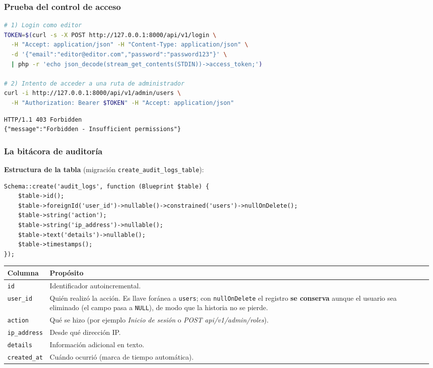 \subsubsection{Prueba del control de acceso}
\begin{lstlisting}[language=bash, caption={Un Editor intenta listar usuarios}]
# 1) Login como editor
TOKEN=$(curl -s -X POST http://127.0.0.1:8000/api/v1/login \
  -H "Accept: application/json" -H "Content-Type: application/json" \
  -d '{"email":"editor@editor.com","password":"password123"}' \
  | php -r 'echo json_decode(stream_get_contents(STDIN))->access_token;')

# 2) Intento de acceder a una ruta de administrador
curl -i http://127.0.0.1:8000/api/v1/admin/users \
  -H "Authorization: Bearer $TOKEN" -H "Accept: application/json"
\end{lstlisting}
\begin{lstlisting}[language={}, caption={Respuesta}]
HTTP/1.1 403 Forbidden
{"message":"Forbidden - Insufficient permissions"}
\end{lstlisting}

\subsubsection{La bitácora de auditoría}
\textbf{Estructura de la tabla} (migración \texttt{create\_audit\_logs\_table}):
\begin{lstlisting}[caption={Migración de audit\_logs}]
Schema::create('audit_logs', function (Blueprint $table) {
    $table->id();
    $table->foreignId('user_id')->nullable()->constrained('users')->nullOnDelete();
    $table->string('action');
    $table->string('ip_address')->nullable();
    $table->text('details')->nullable();
    $table->timestamps();
});
\end{lstlisting}
\begin{longtable}{p{3.2cm}p{11.8cm}}
\toprule
\textbf{Columna} & \textbf{Propósito} \\
\midrule
\endhead
\texttt{id} & Identificador autoincremental. \\
\texttt{user\_id} & Quién realizó la acción. Es llave foránea a \texttt{users}; con \texttt{nullOnDelete} el registro \textbf{se conserva} aunque el usuario sea eliminado (el campo pasa a \texttt{NULL}), de modo que la historia no se pierde. \\
\texttt{action} & Qué se hizo (por ejemplo \emph{Inicio de sesión} o \emph{POST api/v1/admin/roles}). \\
\texttt{ip\_address} & Desde qué dirección IP. \\
\texttt{details} & Información adicional en texto. \\
\texttt{created\_at} & Cuándo ocurrió (marca de tiempo automática). \\
\bottomrule
\end{longtable}

